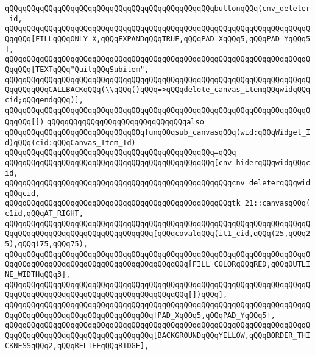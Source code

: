 \verb|qQQqqQQqqQQqqQQqqQQqqQQqqQQqqQQqqQQqqQQqqQQqqQQqbuttonqQQq(cnv_deleter_id,|\newline
\verb|qQQqqQQqqQQqqQQqqQQqqQQqqQQqqQQqqQQqqQQqqQQqqQQqqQQqqQQqqQQqqQQqqQQqqQQqqQQq[FILLqQQqONLY_X,qQQqEXPANDqQQqTRUE,qQQqPAD_XqQQq5,qQQqPAD_YqQQq5],|\newline
\verb|qQQqqQQqqQQqqQQqqQQqqQQqqQQqqQQqqQQqqQQqqQQqqQQqqQQqqQQqqQQqqQQqqQQqqQQqqQQq[TEXTqQQq"QuitqQQqSubitem",|\newline
\verb|qQQqqQQqqQQqqQQqqQQqqQQqqQQqqQQqqQQqqQQqqQQqqQQqqQQqqQQqqQQqqQQqqQQqqQQqqQQqqQQqCALLBACKqQQq(\\qQQq()qQQq=>qQQqdelete_canvas_itemqQQqwidqQQqcid;qQQqendqQQq)],|\newline
\verb|qQQqqQQqqQQqqQQqqQQqqQQqqQQqqQQqqQQqqQQqqQQqqQQqqQQqqQQqqQQqqQQqqQQqqQQqqQQq[])|\newline
\newline
\verb|qQQqqQQqqQQqqQQqqQQqqQQqqQQqqQQqalso|\newline
\verb|qQQqqQQqqQQqqQQqqQQqqQQqqQQqqQQqfunqQQqsub_canvasqQQq(wid:qQQqWidget_Id)qQQq(cid:qQQqCanvas_Item_Id)|\newline
\verb|qQQqqQQqqQQqqQQqqQQqqQQqqQQqqQQqqQQqqQQqqQQqqQQq=qQQq|\newline
\verb|qQQqqQQqqQQqqQQqqQQqqQQqqQQqqQQqqQQqqQQqqQQqqQQq[cnv_hiderqQQqwidqQQqcid,|\newline
\verb|qQQqqQQqqQQqqQQqqQQqqQQqqQQqqQQqqQQqqQQqqQQqqQQqqQQqcnv_deleterqQQqwidqQQqcid,|\newline
\verb|qQQqqQQqqQQqqQQqqQQqqQQqqQQqqQQqqQQqqQQqqQQqqQQqqQQqtk_21::canvasqQQq(c1id,qQQqAT_RIGHT,|\newline
\verb|qQQqqQQqqQQqqQQqqQQqqQQqqQQqqQQqqQQqqQQqqQQqqQQqqQQqqQQqqQQqqQQqqQQqqQQqqQQqqQQqqQQqqQQqqQQqqQQqqQQqqQQq[qQQqcovalqQQq(it1_cid,qQQq(25,qQQq25),qQQq(75,qQQq75),|\newline
\verb|qQQqqQQqqQQqqQQqqQQqqQQqqQQqqQQqqQQqqQQqqQQqqQQqqQQqqQQqqQQqqQQqqQQqqQQqqQQqqQQqqQQqqQQqqQQqqQQqqQQqqQQqqQQqqQQq[FILL_COLORqQQqRED,qQQqOUTLINE_WIDTHqQQq3],|\newline
\verb|qQQqqQQqqQQqqQQqqQQqqQQqqQQqqQQqqQQqqQQqqQQqqQQqqQQqqQQqqQQqqQQqqQQqqQQqqQQqqQQqqQQqqQQqqQQqqQQqqQQqqQQqqQQqqQQq[])qQQq],|\newline
\verb|qQQqqQQqqQQqqQQqqQQqqQQqqQQqqQQqqQQqqQQqqQQqqQQqqQQqqQQqqQQqqQQqqQQqqQQqqQQqqQQqqQQqqQQqqQQqqQQqqQQqqQQq[PAD_XqQQq5,qQQqPAD_YqQQq5],|\newline
\verb|qQQqqQQqqQQqqQQqqQQqqQQqqQQqqQQqqQQqqQQqqQQqqQQqqQQqqQQqqQQqqQQqqQQqqQQqqQQqqQQqqQQqqQQqqQQqqQQqqQQqqQQq[BACKGROUNDqQQqYELLOW,qQQqBORDER_THICKNESSqQQq2,qQQqRELIEFqQQqRIDGE],|\newline
